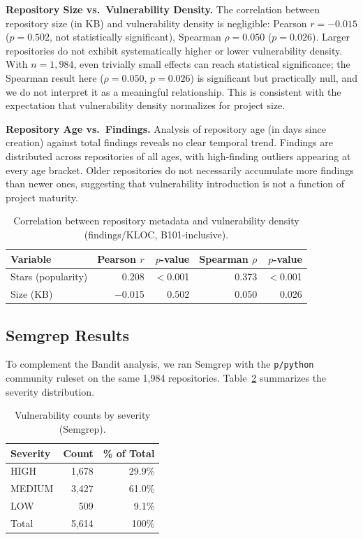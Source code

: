 \documentclass[sigconf,authordraft]{acmart}
\begin{document}
\textbf{Repository Size vs.\ Vulnerability Density.}
The correlation between repository size (in KB) and vulnerability
density is negligible: Pearson $r = -0.015$ ($p = 0.502$, not
statistically significant), Spearman $\rho = 0.050$ ($p = 0.026$).
Larger repositories do not exhibit systematically higher or lower
vulnerability density. With $n = 1{,}984$, even trivially small effects
can reach statistical significance; the Spearman result here
($\rho = 0.050$, $p = 0.026$) is significant but practically null, and
we do not interpret it as a meaningful relationship. This is consistent
with the expectation that vulnerability density normalizes for project
size.

\textbf{Repository Age vs.\ Findings.}
Analysis of repository age (in days since creation) against total
findings reveals no clear temporal trend. Findings are distributed
across repositories of all ages, with high-finding outliers appearing
at every age bracket. Older repositories do not necessarily accumulate
more findings than newer ones, suggesting that vulnerability
introduction is not a function of project maturity.

\begin{table}[h]
  \caption{Correlation between repository metadata and vulnerability density (findings/KLOC, B101-inclusive).}
  \label{tab:correlations}
  \begin{tabular}{lrrrr}
    \toprule
    Variable & Pearson $r$ & $p$-value & Spearman $\rho$ & $p$-value \\
    \midrule
    Stars (popularity) & 0.208 & $<$0.001 & 0.373 & $<$0.001 \\
    Size (KB)          & $-$0.015 & 0.502 & 0.050 & 0.026 \\
    \bottomrule
  \end{tabular}
\end{table}

\newpage
\subsection{Semgrep Results}

To complement the Bandit analysis, we ran Semgrep with the
\texttt{p/python} community ruleset on the same 1{,}984 repositories.
Table~\ref{tab:severity-semgrep} summarizes the severity distribution.

\begin{table}[h]
  \caption{Vulnerability counts by severity (Semgrep).}
  \label{tab:severity-semgrep}
  \begin{tabular}{lrr}
    \toprule
    Severity & Count & \% of Total \\
    \midrule
    HIGH   & 1{,}678 & 29.9\% \\
    MEDIUM & 3{,}427 & 61.0\% \\
    LOW    &    509  &  9.1\% \\
    \midrule
    Total  & 5{,}614 & 100\% \\
    \bottomrule
  \end{tabular}
\end{table}
\end{document}
